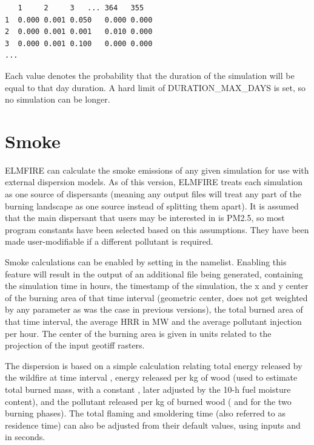 \begin{verbatim}
   1     2     3   ... 364   355 
1  0.000 0.001 0.050   0.000 0.000
2  0.000 0.001 0.001   0.010 0.000
3  0.000 0.001 0.100   0.000 0.000
...
\end{verbatim}

Each value denotes the probability that the duration of the simulation will be equal to that day duration. A hard limit of DURATION\_MAX\_DAYS is set, so no simulation can be longer. 


\section{Smoke}
\label{smoke}

ELMFIRE can calculate the smoke emissions of any given simulation for use with external dispersion models. As of this version, ELMFIRE treats each simulation as one source of dispersants (meaning any output files will treat any part of the burning landscape as one source instead of splitting them apart). It is assumed that the main dispersant that users may be interested in is PM2.5, so most program constants have been selected based on this assumptions. They have been made user-modifiable if a different pollutant is required. 

Smoke calculations can be enabled by setting  in the  namelist. Enabling this feature will result in the output of an additional  file being generated, containing the simulation time in hours, the timestamp of the simulation, the x and y center of the burning area of that time interval (geometric center, does not get weighted by any parameter as was the case in previous versions), the total burned area of that time interval, the average HRR in MW and the average pollutant injection per hour. The center of the burning area is given in units related to the projection of the input geotiff rasters.

The dispersion is based on a simple calculation relating total energy released by the wildfire at time interval , energy released per kg of wood (used to estimate total burned mass, with a constant , later adjusted by the 10-h fuel moisture content), and the pollutant released per kg of burned wood ( and  for the two burning phases). The total flaming and smoldering time (also referred to as residence time) can also be adjusted from their default values, using inputs  and  in seconds.

